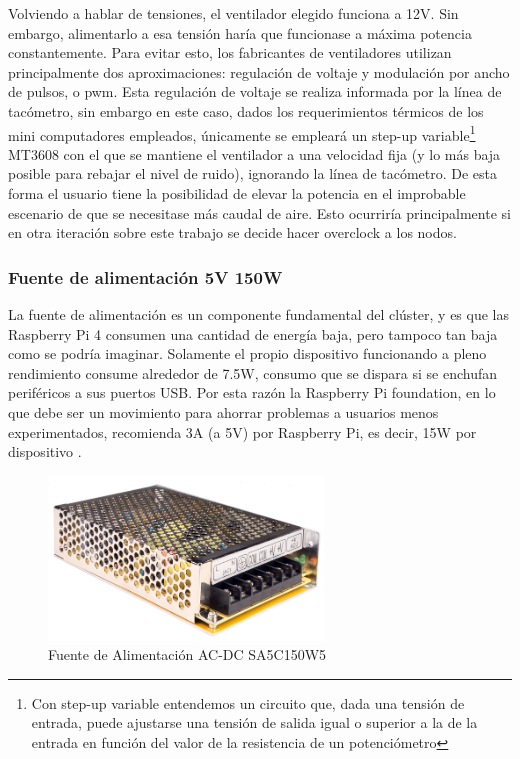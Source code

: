 Volviendo a hablar de tensiones, el ventilador elegido funciona a 12V. Sin embargo, alimentarlo a esa tensión haría que funcionase a máxima potencia constantemente. Para evitar esto, los fabricantes de ventiladores utilizan principalmente dos aproximaciones: regulación de voltaje y modulación por ancho de pulsos, o \acrshort{pwm}. Esta regulación de voltaje se realiza informada por la línea de tacómetro, sin embargo en este caso, dados los requerimientos térmicos de los mini computadores empleados, únicamente se empleará un step-up variable\footnote{Con step-up variable entendemos un circuito que, dada una tensión de entrada, puede ajustarse una tensión de salida igual o superior a la de la entrada en función del valor de la resistencia de un potenciómetro} MT3608 con el que se mantiene el ventilador a una velocidad fija (y lo más baja posible para rebajar el nivel de ruido), ignorando la línea de tacómetro.
De esta forma el usuario tiene la posibilidad de elevar la potencia en el improbable escenario de que se necesitase más caudal de aire. Esto ocurriría principalmente si en otra iteración sobre este trabajo se decide hacer overclock a los nodos.

\subsubsection{Fuente de alimentación 5V 150W}
La fuente de alimentación es un componente fundamental del clúster, y es que las Raspberry Pi 4 consumen una cantidad de energía baja, pero tampoco tan baja como se podría imaginar. Solamente el propio dispositivo funcionando a pleno rendimiento consume alrededor de 7.5W, consumo que se dispara si se enchufan periféricos a sus puertos USB. Por esta razón la Raspberry Pi foundation, en lo que debe ser un movimiento para ahorrar problemas a usuarios menos experimentados, recomienda 3A (a 5V) por Raspberry Pi, es decir, 15W por dispositivo \cite{raspberrypi_power-requirements}.

\begin{figure}[h!]
  \vspace*{0.5cm}
  \centering
  \includegraphics[width=0.65\textwidth]{img/psu.jpg}
  \caption{Fuente de Alimentación AC-DC SA5C150W5}
  \label{fig:psu_photo}
  \vspace*{0.1cm}
\end{figure}

